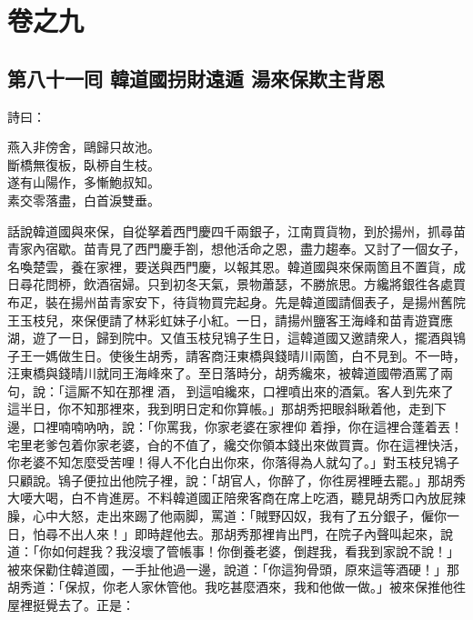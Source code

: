\part*{{\titlename}卷之九}



\chapter*{第八十一囘 韓道國拐財遠遁 湯來保欺主背恩}


詩曰：

\begin{myquote}
燕入非傍舍，鷗歸只故池。\\斷橋無復板，臥桺自生枝。\\遂有山陽作，多慚鮑叔知。\\素交零落盡，白首淚雙垂。
\end{myquote}

話說韓道國與來保，自從拏着西門慶四千兩銀子，江南買貨物，到於揚州，抓尋苗青家內宿歇。苗青見了西門慶手劄，想他活命之恩，盡力趨奉。又討了一個女子，名喚楚雲，養在家裡，要送與西門慶，以報其恩。韓道國與來保兩箇且不置貨，成日尋花問桺，飲酒宿婦。{}只到初冬天氣，景物蕭瑟，不勝旅思。方纔將銀徃各處買布疋，裝在揚州苗青家安下，待貨物買完起身。先是韓道國請個表子，是揚州舊院王玉枝兒，來保便請了林彩虹妹子小紅。一日，請揚州鹽客王海峰和苗青遊寶應湖，遊了一日，歸到院中。又值玉枝兒鴇子生日，{}這韓道國又邀請衆人，擺酒與鴇子王一媽做生日。使後生胡秀，請客商汪東橋與錢晴川兩箇，白不見到。不一時，汪東橋與錢晴川就同王海峰來了。至日落時分，胡秀纔來，被韓道國帶酒罵了兩句，說：「這厮不知在那裡𠳹酒，𠳹到這咱纔來，口裡噴出來的酒氣。客人到先來了這半日，你不知那裡來，我到明日定和你算帳。」那胡秀把眼斜瞅着他，走到下邊，口裡喃喃吶吶，說：「你罵我，你家老婆在家裡仰𢵞着掙，你在這裡合蓬着丟！宅里老爹包着你家老婆，㒲的不值了，纔交你領本錢出來做買賣。你在這裡快活，你老婆不知怎麼受苦哩！得人不化白出你來，你落得為人就勾了。」{}對玉枝兒鴇子只顧說。鴇子便拉出他院子裡，說：「胡官人，你醉了，你徃房裡睡去罷。」那胡秀大喓大喝，白不肯進房。不料韓道國正陪衆客商在席上吃酒，聽見胡秀口內放屁辣臊，心中大怒，走出來踢了他兩脚，罵道：「賊野囚奴，我有了五分銀子，僱你一日，怕尋不出人來！」{}即時趕他去。那胡秀那裡肯出門，在院子內聲叫起來，說道：「你如何趕我？我沒壞了管帳事！你倒養老婆，倒趕我，看我到家說不說！」{}被來保勸住韓道國，一手扯他過一邊，說道：「你這狗骨頭，原來這等酒硬！」那胡秀道：「保叔，你老人家休管他。我吃甚麼酒來，我和他做一做。」被來保推他徃屋裡挺覺去了。正是：

